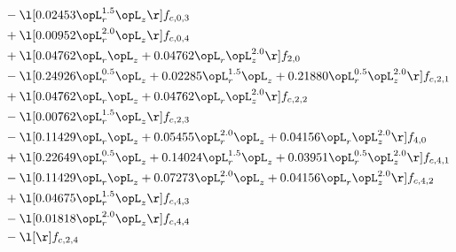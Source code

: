 \begin{alignat}{2}
& - \l[  0.02453 \opL_r^{1.5} \opL_z  \r] f_{c,0,3} \nonumber \\ 
& + \l[  0.00952 \opL_r^{2.0} \opL_z  \r] f_{c,0,4} \nonumber \\ 
& + \l[  0.04762 \opL_r \opL_z +  0.04762 \opL_r \opL_z^{2.0}  \r] f_{2,0} \nonumber \\ 
& - \l[  0.24926 \opL_r^{0.5} \opL_z +  0.02285 \opL_r^{1.5} \opL_z +  0.21880 \opL_r^{0.5} \opL_z^{2.0}  \r] f_{c,2,1} \nonumber \\ 
& + \l[  0.04762 \opL_r \opL_z +  0.04762 \opL_r \opL_z^{2.0}  \r] f_{c,2,2} \nonumber \\ 
& - \l[  0.00762 \opL_r^{1.5} \opL_z  \r] f_{c,2,3} \nonumber \\ 
& - \l[  0.11429 \opL_r \opL_z +  0.05455 \opL_r^{2.0} \opL_z +  0.04156 \opL_r \opL_z^{2.0}  \r] f_{4,0} \nonumber \\ 
& + \l[  0.22649 \opL_r^{0.5} \opL_z +  0.14024 \opL_r^{1.5} \opL_z +  0.03951 \opL_r^{0.5} \opL_z^{2.0}  \r] f_{c,4,1} \nonumber \\ 
& - \l[  0.11429 \opL_r \opL_z +  0.07273 \opL_r^{2.0} \opL_z +  0.04156 \opL_r \opL_z^{2.0}  \r] f_{c,4,2} \nonumber \\ 
& + \l[  0.04675 \opL_r^{1.5} \opL_z  \r] f_{c,4,3} \nonumber \\ 
& - \l[  0.01818 \opL_r^{2.0} \opL_z  \r] f_{c,4,4} \nonumber \\ 
& - \l[  \r] f_{c,2,4} \nonumber \\ 
\end{alignat} 


